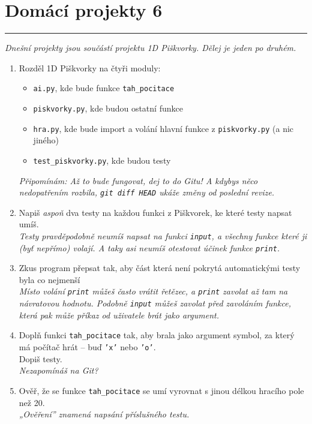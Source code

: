 \documentclass[a4paper,10pt]{article}
\newcommand\plsetno{6}
\newcommand\startsection[1]{
     \vspace{0.2ex}
    \hrule
    {\fontspec{Oxygen} \tiny
     \vspace{-1ex}
     \emph{#1}
     \vspace{-1.5em}
    }
}
\begin{document}
\section*{Domácí projekty \plsetno}

\startsection{Dnešní projekty jsou součástí projektu 1D Piškvorky. Dělej je jeden po druhém.}

\begin{enumerate}
\item Rozděl 1D Piškvorky na čtyři moduly:
    \begin{itemize}
        \item \texttt{ai.py}, kde bude funkce \texttt{tah\_pocitace}
        \item \texttt{piskvorky.py}, kde budou ostatní funkce
        \item \texttt{hra.py}, kde bude import a volání hlavní funkce z \texttt{piskvorky.py} (a nic jiného)
        \item \texttt{test\_piskvorky.py}, kde budou testy
    \end{itemize}
    \emph{\small Připomínám: Až to bude fungovat, dej to do Gitu! A kdybys něco nedopatřením rozbila, \texttt{git diff HEAD} ukáže změny od poslední revize.}

\item Napiš \emph{aspoň} dva testy na každou funkci z Piškvorek, ke které testy napsat umíš.
    \\\emph{\small Testy pravděpodobně neumíš napsat na funkci \texttt{input}, a všechny funkce které ji (byť nepřímo) volají.
            A taky asi neumíš otestovat účinek funkce \texttt{print}.}

\item Zkus program přepsat tak, aby část která není pokrytá automatickými testy byla co nejmenší
    \\\emph{\small Místo volání \texttt{print} můžeš často vrátit řetězec,
            a \texttt{print} zavolat až tam na návratovou hodnotu.
            Podobně \texttt{input} můžeš zavolat před zavoláním funkce,
            která pak může příkaz od uživatele brát jako argument.}

\item Doplň funkci \texttt{tah\_pocitace} tak, aby brala jako argument symbol, za který má počítač hrát – buď \texttt{'x'} nebo \texttt{'o'}.
    \\Dopiš testy.
    \\\emph{\small Nezapomínáš na Git?}

\item Ověř, že se funkce \texttt{tah\_pocitace} se umí vyrovnat s jinou délkou hracího pole než 20.
    \\\emph{\small „Ověření” znamená napsání příslušného testu.}


\end{enumerate}
\end{document}
